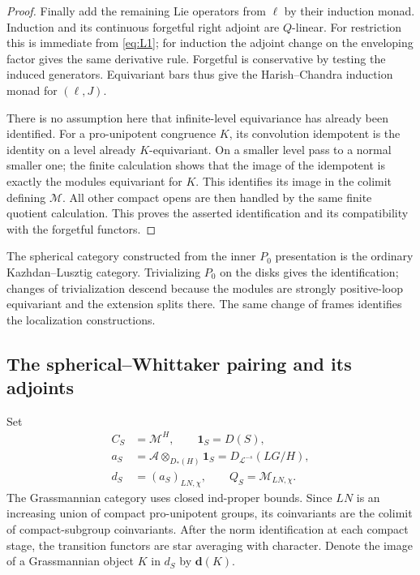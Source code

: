 \documentclass[11pt]{article}
\numberwithin{equation}{section}
\theoremstyle{definition}
\theoremstyle{remark}
\begin{document}
\begin{proof}
Finally add the remaining Lie operators from $\ell$ by their
induction monad.  Induction and its continuous forgetful right
adjoint are $Q$-linear.  For restriction this is immediate from
\eqref{eq:L1}; for induction the adjoint change on the
enveloping factor gives the same derivative rule.  Forgetful
is conservative by testing the induced generators.  Equivariant
bars thus give the Harish--Chandra induction monad for $(\ell,J)$.

There is no assumption here that infinite-level equivariance has
already been identified.  For a pro-unipotent congruence $K$, its
convolution idempotent is the identity on a level already
$K$-equivariant.  On a smaller level pass to a normal smaller
one; the finite calculation shows that the image of the
idempotent is exactly the modules equivariant for $K$.  This
identifies its image in the colimit defining $\mathcal M$.
All other compact opens are then handled by the same finite
quotient calculation.  This proves the asserted identification
and its compatibility with the forgetful functors.
\end{proof}

The spherical category constructed from the inner $P_0$ presentation
is the ordinary Kazhdan--Lusztig category.  Trivializing $P_0$ on the
disks gives the identification; changes of trivialization descend
because the modules are strongly positive-loop equivariant and the
extension splits there.  The same change of frames identifies the
localization constructions.

\subsection{The spherical--Whittaker pairing and its adjoints}

Set
\[
 \begin{split}
 C_S&=\mathcal M^H,\qquad \mathbf1_S=D(S),\\
 a_S&=\mathcal A\otimes_{D_*(H)}\mathbf1_S
           =D_{\mathcal L^{-s}}(LG/H),\\
 d_S&=(a_S)_{LN,\chi},\qquad
 Q_S=\mathcal M_{LN,\chi}.
 \end{split}
\]
The Grassmannian category uses closed ind-proper bounds.  Since $LN$
is an increasing union of compact pro-unipotent groups, its
coinvariants are the colimit of compact-subgroup coinvariants.
After the norm identification at each compact stage, the transition
functors are star averaging with character.  Denote the image of a
Grassmannian object $K$ in $d_S$ by $\mathbf d(K)$.
\end{document}
